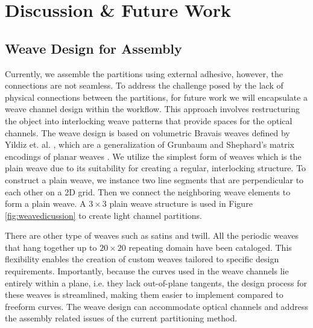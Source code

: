 \section{Discussion \& Future Work}


\subsection{Weave Design for Assembly}

Currently, we assemble the partitions using external adhesive, however, the connections are not seamless.
To address the challenge posed by the lack of physical connections between the partitions, for future work we will encapsulate a weave channel design within the workflow. This approach involves restructuring the object into interlocking weave patterns that provide spaces for the optical channels. %
The weave design is based on volumetric Bravais weaves defined by Yildiz et. al. \cite{yildiz_volweaves2025}, which are a generalization of Grunbaum and Shephard's matrix encodings of planar weaves \cite{grunbaum1988isonemal}. We utilize the simplest form of weaves which is the plain weave due to its suitability for creating a regular, interlocking structure. To construct a plain weave, we instance two line segments that are perpendicular to each other on a 2D grid. Then we connect the neighboring weave elements to form a plain weave. A $3\times3$ plain weave structure is used in Figure \ref{fig:weavedicussion} to create light channel partitions.

There are other type of weaves such as satins and twill. All the periodic weaves that hang together up to $20\times20$ repeating domain \cite{grunbaum1988catalogue} have been cataloged. This flexibility enables the creation of custom weaves tailored to specific design requirements. Importantly, because the curves used in the weave channels lie entirely within a plane, i.e. they lack out-of-plane tangents, the design process for these weaves is streamlined, making them easier to implement compared to freeform curves.
The weave design can accommodate optical channels and address the assembly related issues of the current partitioning method.

